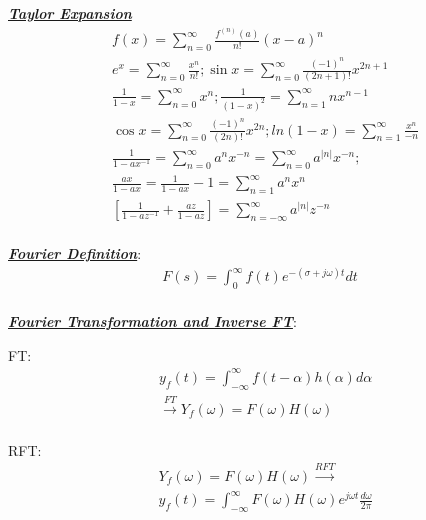 \documentclass[12pt]{article}
\newcommand{\bulletPoint}[1]{\ul{\textit{\textbf{#1}}}}
\begin{document}
\begin{multicols*}{4}
\bulletPoint{Taylor Expansion}
\useshortskip \begin{equation*}
    \begin{split}
        & f(x)= \sum^{\infty}_{n=0}\frac{f^{(n)}(a)}{n!}(x-a)^n\\[-3pt]
        & e^x=\sum^{\infty}_{n=0}\frac{x^n}{n!}; \sin x = \sum^{\infty}_{n=0}\frac{(-1)^n}{(2n+1)!}x^{2n+1}\\[-3pt]
        & \frac{1}{1-x}=\sum^{\infty}_{n=0}x^n; \frac{1}{(1-x)^2} = \sum^{\infty}_{n=1}nx^{n-1}\\[-3pt]
        & \cos x = \sum^{\infty}_{n=0}\frac{(-1)^n}{(2n)!}x^{2n}; ln(1-x) = \sum^{\infty}_{n=1}\frac{x^n}{-n}\\[-3pt]
        & \frac{1}{1-ax^{-1}} = \sum^\infty_{n=0}a^nx^{-n} = \sum^\infty_{n=0}a^{|n|}x^{-n}; \\[-3pt]
        & \frac{ax}{1-ax} = \frac{1}{1-ax} - 1 = \sum^\infty_{n=1}a^n x^n\\[-3pt]
        & \left[\frac{1}{1-az^{-1}}+\frac{az}{1-az}\right]=\sum^\infty_{n=-\infty}a^{|n|}z^{-n}\\[-8pt]
    \end{split}
\end{equation*}


\bulletPoint{Fourier Definition}:
\useshortskip \begin{equation*}
    \begin{split}
        F(s) = \int^\infty_0 f(t)e^{-(\sigma + j \omega)t}dt\\[-8pt]
    \end{split}
\end{equation*}


\bulletPoint{Fourier Transformation and Inverse FT}:

FT:
\useshortskip \begin{equation*}
    \begin{split}
        & y_f(t) = \int^{\infty}_{-\infty}f(t-\alpha)h(\alpha)d\alpha\\[-5pt]
        & \xrightarrow{FT} Y_f(\omega) = F(\omega)H(\omega)\\[-5pt]
    \end{split}
\end{equation*}

RFT:
\useshortskip \begin{equation*}
    \begin{split}
        & Y_f(\omega) = F(\omega)H(\omega) \xrightarrow{RFT}\\[-5pt]
        & y_f(t) = \int^{\infty}_{-\infty}F(\omega)H(\omega)e^{j\omega t}\frac{d\omega}{2\pi}\\[-5pt]
    \end{split}
\end{equation*}



\end{multicols*}
\end{document}
